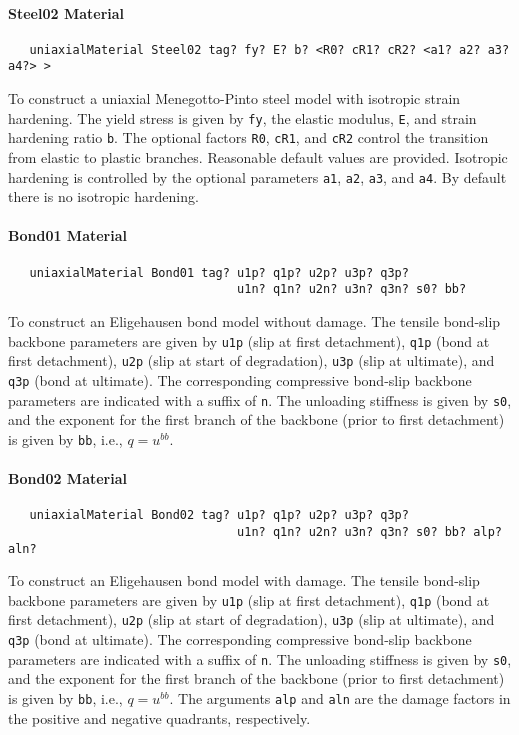 \documentclass[12pt]{article}
\begin{document}
\paragraph{Steel02 Material}
{\sf\small
\begin{verbatim}
   uniaxialMaterial Steel02 tag? fy? E? b? <R0? cR1? cR2? <a1? a2? a3? a4?> >
\end{verbatim}
}

To construct a uniaxial Menegotto-Pinto steel model with isotropic strain
hardening. The yield stress is given by {\tt fy}, the elastic modulus,
{\tt E}, and strain hardening ratio {\tt b}.
The optional factors {\tt R0}, {\tt cR1}, and {\tt cR2} control the
transition from elastic to plastic branches. Reasonable default values are
provided. Isotropic hardening is controlled by the optional parameters
{\tt a1}, {\tt a2}, {\tt a3}, and {\tt a4}. By default
there is no isotropic hardening.

\paragraph{Bond01 Material}
{\sf\small
\begin{verbatim}
   uniaxialMaterial Bond01 tag? u1p? q1p? u2p? u3p? q3p?
                                u1n? q1n? u2n? u3n? q3n? s0? bb?
\end{verbatim}  
}

To construct an Eligehausen bond model without damage. The tensile
bond-slip backbone parameters are given by {\tt u1p} (slip at first
detachment), {\tt q1p} (bond at first detachment), {\tt u2p} (slip at
start of degradation), {\tt u3p} (slip at ultimate), and
{\tt q3p} (bond at ultimate). The corresponding compressive bond-slip backbone parameters are indicated with a suffix of {\tt n}.  The unloading stiffness
is given by {\tt s0}, and the exponent for the first branch of the backbone
(prior to first detachment) is given by {\tt bb}, i.e., $q = u^{bb}$.

\paragraph{Bond02 Material}
{\sf\small
\begin{verbatim}
   uniaxialMaterial Bond02 tag? u1p? q1p? u2p? u3p? q3p?
                                u1n? q1n? u2n? u3n? q3n? s0? bb? alp? aln?
\end{verbatim}
}

To construct an Eligehausen bond model with damage. The tensile bond-slip
backbone parameters are given by {\tt u1p} (slip at first detachment),
{\tt q1p} (bond at first detachment), {\tt u2p} (slip at start of
degradation), {\tt u3p} (slip at ultimate), and {\tt q3p} (bond at ultimate).
The corresponding compressive bond-slip backbone parameters are
indicated with a suffix of {\tt n}.  The unloading stiffness
is given by {\tt s0}, and the exponent for the first branch of the backbone
(prior to first detachment) is given by {\tt bb}, i.e., $q = u^{bb}$.
The arguments {\tt alp} and {\tt aln} are the damage factors in the positive
and negative quadrants, respectively.
\end{document}
